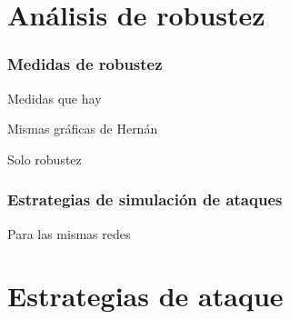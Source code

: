 \section{Análisis de robustez}

\subsubsection{Medidas de robustez}


Medidas que hay 

Mismas gráficas de Hernán

Solo robustez

\subsubsection{Estrategias de simulación de ataques}


Para las mismas redes

\section{Estrategias de ataque}